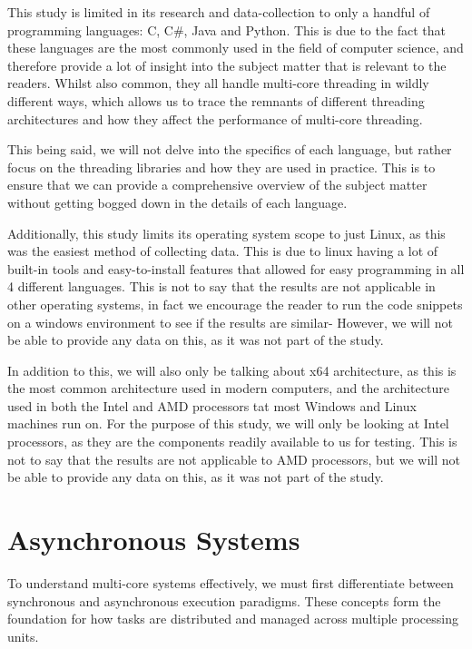 \documentclass[12pt,a4paper]{article}
\begin{document}
This study is limited in its research and data-collection to only a handful of programming languages: C, C\#, Java and Python. This is due to the fact that these languages are the most commonly used in the field of computer science, and therefore provide a lot of insight into the subject matter that is relevant to the readers. Whilst also common, they all handle multi-core threading in wildly different ways, which allows us to trace the remnants of different threading architectures and how they affect the performance of multi-core threading.

This being said, we will not delve into the specifics of each language, but rather focus on the threading libraries and how they are used in practice. This is to ensure that we can provide a comprehensive overview of the subject matter without getting bogged down in the details of each language.

Additionally, this study limits its operating system scope to just Linux, as this was the easiest method of collecting data. This is due to linux having a lot of built-in tools and easy-to-install features that allowed for easy programming in all 4 different languages. This is not to say that the results are not applicable in other operating systems, in fact we encourage the reader to run the code snippets on a windows environment to see if the results are similar- However, we will not be able to provide any data on this, as it was not part of the study.

In addition to this, we will also only be talking about x64 architecture, as this is the most common architecture used in modern computers, and the architecture used in both the Intel and AMD processors tat most Windows and Linux machines run on. For the purpose of this study, we will only be looking at Intel processors, as they are the components readily available to us for testing. This is not to say that the results are not applicable to AMD processors, but we will not be able to provide any data on this, as it was not part of the study.

\section{Asynchronous Systems}

To understand multi-core systems effectively, we must first differentiate between synchronous and asynchronous execution paradigms. These concepts form the foundation for how tasks are distributed and managed across multiple processing units.
\end{document}
